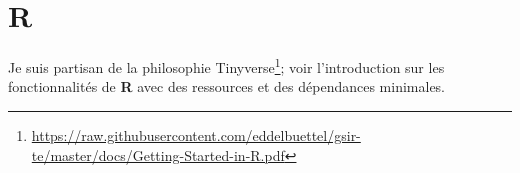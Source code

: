 \documentclass[
  11pt,
  letterpaper,
]{article}
\renewcommand{\href}[2]{#2\footnote{\url{#1}}}
\theoremstyle{definition}
\theoremstyle{definition}
\theoremstyle{definition}
\theoremstyle{remark}
\begin{document}
\hypertarget{r}{%
\section*{\texorpdfstring{\textbf{R}}{R}}\label{r}}

Je suis partisan de la \href{https://raw.githubusercontent.com/eddelbuettel/gsir-te/master/docs/Getting-Started-in-R.pdf}{philosophie Tinyverse}; voir l'introduction sur les fonctionnalités de \textbf{R} avec des ressources et des dépendances minimales.

  
\end{document}

